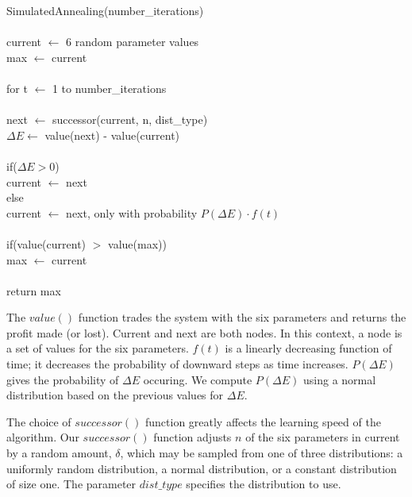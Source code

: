 \documentclass[12pt]{article}
\begin{document}
\vspace{25pt}
\setlength{\parindent}{5mm}
\indent SimulatedAnnealing(number\_iterations)\\\\
\indent \indent current $\leftarrow$ 6 random parameter values\\
\indent \indent max $\leftarrow$ current\\\\
\indent \indent for t $\leftarrow$ 1 to number\_iterations\\\\
\indent \indent \indent next $\leftarrow$ successor(current, n, dist\_type)\\
\indent \indent \indent $\Delta E \leftarrow$ value(next) - value(current)\\\\
\indent \indent \indent if($\Delta E > 0$)\\
\indent \indent \indent \indent current $\leftarrow$ next\\
\indent \indent \indent else\\
\indent \indent \indent \indent current $\leftarrow$ next, only with probability $P(\Delta E) \cdot f(t)$\\\\
\indent \indent \indent if(value(current) $>$ value(max))\\
\indent \indent \indent \indent max $\leftarrow$ current\\\\
\indent \indent return max\\
\setlength{\parindent}{0mm}

\pagebreak
The $value()$ function trades the system with the six parameters and returns the
profit made (or lost).  Current and next are both nodes.  In this context, a
node is a set of values for the six parameters. $f(t)$ is a linearly decreasing
function of time; it decreases the probability of downward steps as time
increases. $P(\Delta E)$ gives the probability of $\Delta E$ occuring. We
compute $P(\Delta E)$ using a normal distribution based on the previous values
for $\Delta E$.

The choice of $successor()$ function greatly affects the learning speed of the
algorithm.  Our $successor()$ function adjusts $n$ of the six parameters in current
by a random amount, $\delta$, which may be sampled from one of three
distributions: a uniformly random distribution, a normal distribution, or a
constant distribution of size one.  The parameter $dist\_type$ specifies the
distribution to use.
\end{document}
